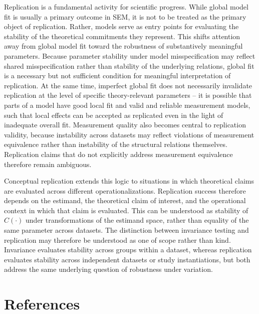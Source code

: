 \documentclass[
  12pt,
  letterpaper,
  man]{apa7}
\begin{document}
Replication is a fundamental activity for scientific progress. While
global model fit is usually a primary outcome in SEM, it is not to be
treated as the primary object of replication. Rather, models serve as
entry points for evaluating the stability of the theoretical commitments
they represent. This shifts attention away from global model fit toward
the robustness of substantively meaningful parameters. Because parameter
stability under model misspecification may reflect shared
misspecification rather than stability of the underlying relations,
global fit is a necessary but not sufficient condition for meaningful
interpretation of replication. At the same time, imperfect global fit
does not necessarily invalidate replication at the level of specific
theory-relevant parameters -- it is possible that parts of a model have
good local fit and valid and reliable measurement models, such that
local effects can be accepted as replicated even in the light of
inadequate overall fit. Measurement quality also becomes central to
replication validity, because instability across datasets may reflect
violations of measurement equivalence rather than instability of the
structural relations themselves. Replication claims that do not
explicitly address measurement equivalence therefore remain ambiguous.

Conceptual replication extends this logic to situations in which
theoretical claims are evaluated across different operationalizations.
Replication success therefore depends on the estimand, the theoretical
claim of interest, and the operational context in which that claim is
evaluated. This can be understood as stability of \(C(\cdot)\) under
transformations of the estimand space, rather than equality of the same
parameter across datasets. The distinction between invariance testing
and replication may therefore be understood as one of scope rather than
kind. Invariance evaluates stability across groups within a dataset,
whereas replication evaluates stability across independent datasets or
study instantiations, but both address the same underlying question of
robustness under variation.

\section*{References}\label{references}
\end{document}
